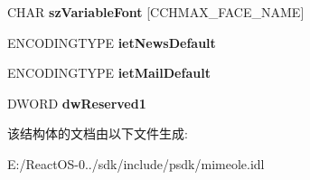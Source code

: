 \begin{DoxyCompactItemize}
C\+H\+AR {\bfseries sz\+Variable\+Font} \mbox{[}C\+C\+H\+M\+A\+X\+\_\+\+F\+A\+C\+E\+\_\+\+N\+A\+ME\mbox{]}
\item 
\mbox{\label{struct_m_i_m_e_o_l_e_1_1_i_mime_international_1_1tag_c_o_d_e_p_a_g_e_i_n_f_o_a2a193f72da4a0998208358e67ea4f899}} 
E\+N\+C\+O\+D\+I\+N\+G\+T\+Y\+PE {\bfseries iet\+News\+Default}
\item 
\mbox{\label{struct_m_i_m_e_o_l_e_1_1_i_mime_international_1_1tag_c_o_d_e_p_a_g_e_i_n_f_o_a09f78aa3404626b2abed103ab1102f1d}} 
E\+N\+C\+O\+D\+I\+N\+G\+T\+Y\+PE {\bfseries iet\+Mail\+Default}
\item 
\mbox{\label{struct_m_i_m_e_o_l_e_1_1_i_mime_international_1_1tag_c_o_d_e_p_a_g_e_i_n_f_o_a7ab43b2708e788d87eba5da2b343b5d3}} 
D\+W\+O\+RD {\bfseries dw\+Reserved1}
\end{DoxyCompactItemize}


该结构体的文档由以下文件生成\+:\begin{DoxyCompactItemize}
\item 
E\+:/\+React\+O\+S-\/0../sdk/include/psdk/mimeole.\+idl\end{DoxyCompactItemize}
